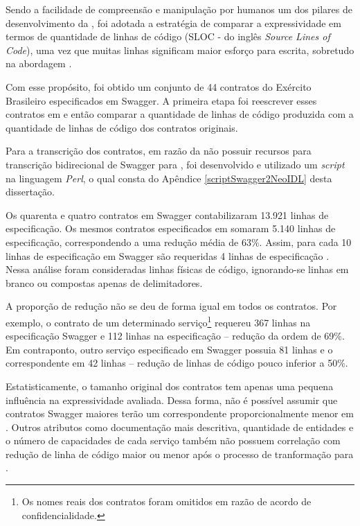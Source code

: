 Sendo a facilidade de compreensão e manipulação por humanos um dos pilares
de desenvolvimento da \neoidl{}, foi adotada a estratégia de comparar a
expressividade em termos de quantidade de linhas de código (SLOC - do inglês
\textit{Source Lines of Code}), uma vez que muitas linhas significam maior
esforço para escrita, sobretudo na abordagem \CtFirst{}.

Com esse propósito, foi obtido um conjunto de 44 contratos do Exército
Brasileiro especificados em Swagger. A primeira etapa foi reescrever esses
contratos em \neoidl{} e então comparar a quantidade de linhas de código
produzida com a quantidade de linhas de código dos contratos originais.

Para a
transcrição dos contratos, em razão da \neoidl{} não possuir recursos para
trans\-crição bidirecional de Swagger para \neoidl{}, foi desenvolvido
e utilizado um \textit{script} na linguagem \textit{Perl}, 
o qual consta do Apêndice \ref{scriptSwagger2NeoIDL} desta dissertação.

Os quarenta e quatro contratos em Swagger contabilizaram 13.921 linhas de
especificação. Os mesmos contratos especificados em \neoidl{} somaram 5.140
linhas de especificação, correspondendo a uma redução média de 63\%. Assim, para
cada 10 linhas de especificação em Swagger são requeridas 4 linhas de
especificação \neoidl{}. Nessa análise foram consideradas linhas físicas de
código, ignorando-se linhas em branco ou compostas apenas de delimitadores.

A proporção de redução não se deu de forma igual em todos os contratos. Por
exemplo, o contrato de um determinado serviço\footnote{Os nomes reais dos
contratos foram omitidos em razão de acordo de confidencialidade.} requereu 367
linhas na especificação Swagger e 112 linhas na especificação \neoidl{} --
redução da ordem de 69\%.
Em contraponto, outro serviço especificado em Swagger possuia 81 linhas e o
correspondente em \neoidl{} 42 linhas -- redução de linhas de código pouco inferior a 50\%.

Estatisticamente, o tamanho original dos contratos tem apenas uma pequena
influência na expressividade avaliada. Dessa forma, não é possível assumir que
contratos Swagger maiores terão um correspondente proporcionalmente menor em
\neoidl{}.
Outros atributos como documentação mais descritiva, quantidade de entidades e o
número de capacidades de cada serviço também não possuem correlação com redução
de linha de código maior ou menor após o processo de tranformação para
\neoidl{}.

